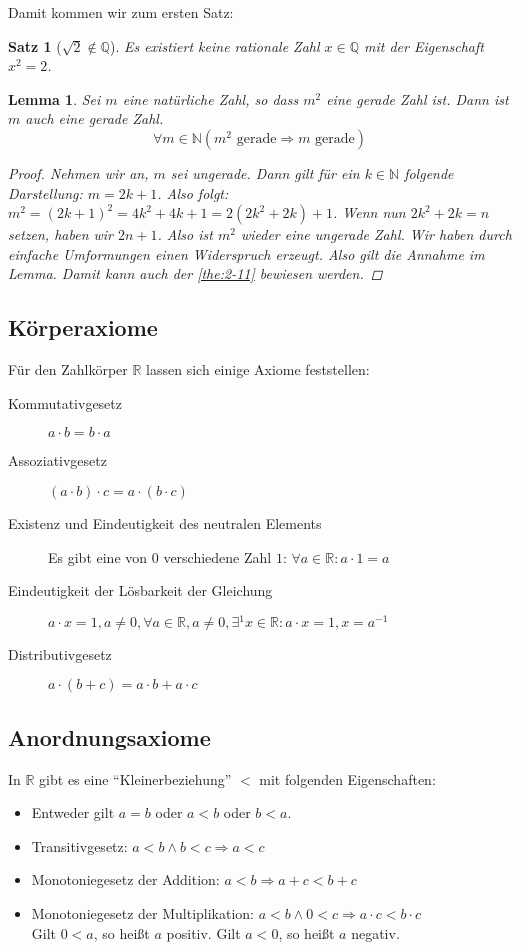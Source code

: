 \documentclass[ngerman,titlepage,twoside, parskip=half*]{scrreprt}
\newcommand*{\N}{\mathbb{N}}
\newcommand*{\Q}{\mathbb{Q}}
\newcommand*{\R}{\mathbb{R}}
\theoremstyle{plain}
\newtheorem{lemma}{Lemma}
\newtheorem{theorem}{Satz}[section]
\theoremstyle{definition}
\theoremstyle{remark}
\begin{document}
Damit kommen wir zum ersten Satz:
\begin{theorem}[$\sqrt{2}\notin \Q$]
  \label{the:2-11}
  Es existiert keine rationale Zahl $x\in \Q$ mit der Eigenschaft
  $x^2=2$.
\end{theorem}

\begin{lemma}
  Sei $m$ eine natürliche Zahl, so dass $m^2$ eine gerade Zahl
  ist. Dann ist $m$ auch eine gerade Zahl.
  \[\forall m \in \N (m^2 \text{ gerade}\Rightarrow m \text{ gerade})\]
  \begin{proof}
    Nehmen wir an, $m$ sei ungerade. Dann gilt für ein $k \in\N$ folgende
    Darstellung: $m=2k+1$. Also folgt: $m^{2}= (2k+1)^{2} = 4k^{2}+ 4k+1=
    2(2k^{2}+2k)+1$. Wenn nun $2k^{2}+2k=n$ setzen, haben wir $2n+1$. Also ist
    $m^{2}$ wieder eine ungerade Zahl. Wir haben durch einfache Umformungen
    einen Widerspruch erzeugt. Also gilt die Annahme im Lemma. Damit
    kann auch der \autoref{the:2-11} bewiesen werden.
  \end{proof}
\end{lemma}

\subsection{Körperaxiome}

Für den Zahlkörper $\R$ lassen sich einige Axiome feststellen:

\begin{description}
\item[Kommutativgesetz] $a \cdot{} b = b \cdot{} a$
\item[Assoziativgesetz] $(a \cdot{} b) \cdot{} c = a \cdot{} (b
  \cdot{} c)$
\item[Existenz und Eindeutigkeit des neutralen Elements] Es gibt eine
  von $0$ verschiedene Zahl $1$: $\forall a \in \R \colon a \cdot 1 = a$
\item[Eindeutigkeit der Lösbarkeit der Gleichung] $a \cdot x = 1, a
  \neq 0, \forall a \in \R, a \neq 0, \exists{}^1 x \in \R \colon a \cdot x
  = 1, x = a^{-1}$
\item[Distributivgesetz] $a \cdot (b+c) = a \cdot b + a \cdot c$
\end{description}

\subsection{Anordnungsaxiome}

In $\R$ gibt es eine "`Kleinerbeziehung"' $<$ mit folgenden
Eigenschaften:
\begin{itemize}
\item Entweder gilt $a=b$ oder $a<b$ oder $b<a$.
\item Transitivgesetz: $a<b \wedge b<c \Rightarrow a<c$
\item Monotoniegesetz der Addition: $a<b \Rightarrow a+c<b+c$
\item Monotoniegesetz der Multiplikation: $a<b \wedge 0<c \Rightarrow
  a \cdot c < b \cdot c$\\
  Gilt $0<a$, so heißt $a$ positiv. Gilt $a<0$, so heißt $a$ negativ.
\end{itemize}
\end{document}
